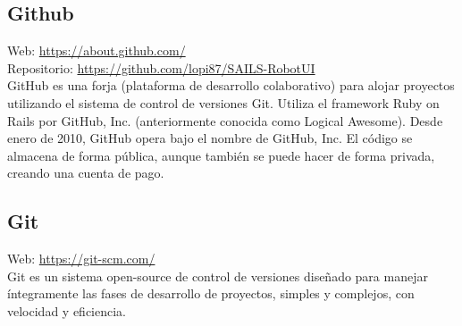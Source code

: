 \subsection{Github}



Web: \url{https://about.github.com/}\\
Repositorio: \url{https://github.com/lopi87/SAILS-RobotUI}\\


GitHub es una forja (plataforma de desarrollo colaborativo) para alojar proyectos utilizando el sistema de control de versiones Git. Utiliza el framework Ruby on Rails por GitHub, Inc. (anteriormente conocida como Logical Awesome). Desde enero de 2010, GitHub opera bajo el nombre de GitHub, Inc. El código se almacena de forma pública, aunque también se puede hacer de forma privada, creando una cuenta de pago.


\subsection{Git}


Web: \url{https://git-scm.com/}\\

Git es un sistema open-source de control de versiones diseñado para manejar íntegramente las fases de desarrollo de proyectos, simples y complejos, con velocidad y eficiencia.\\

